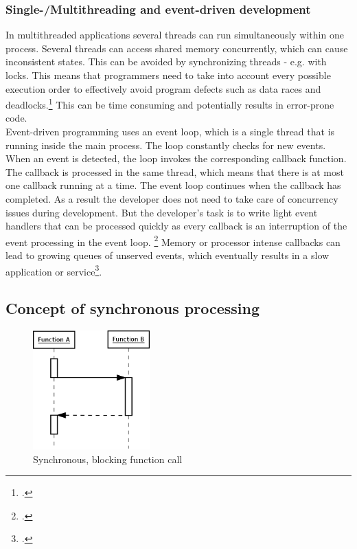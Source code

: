 \subsubsection{Single-/Multithreading and event-driven development}
\label{issue_threads}

In multithreaded applications several threads can run simultaneously within one 
process. Several threads can access shared memory concurrently, which can
cause inconsistent states. This can be avoided by synchronizing threads - e.g.
with locks. This means that programmers need to take into account every possible
execution order to effectively avoid program defects such as data races and 
deadlocks.\footcite[Cf.][10]{Breshears_2009}
This can be time consuming and potentially results in error-prone code.\\

Event-driven programming uses an event loop, which is a single thread that is
running inside the main process.
The loop constantly checks for new events. When an event is detected, the loop
invokes the corresponding callback function. The callback is processed in the
same thread, which means that there is at most one callback running at a time.
The event loop continues when the callback has completed. As a result the
developer does not need to take care of concurrency issues during development.
But the developer's task is to write light event handlers that can be processed
quickly as every callback is an interruption of the event processing in the
event loop. \footcite[Cf.][]{Croucher_2010} Memory or processor intense callbacks
can lead to growing queues of unserved events, which eventually results
in a slow application or service\footcite[Cf.][48]{teixeira_2012}.

\subsection{Concept of synchronous processing}
\label{concept_sync}
\FloatBarrier

\begin{figure}[hbtp]
\centering
\includegraphics[width=0.4\textwidth]{img/synch_call.png}
\caption{Synchronous, blocking function call}
\label{fig:synch_call}
\end{figure}

